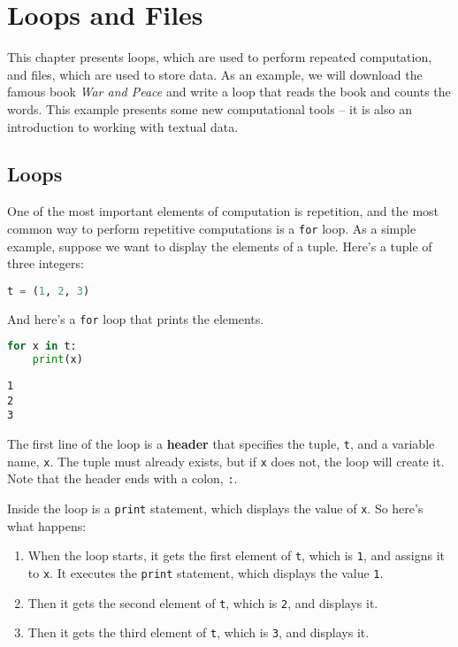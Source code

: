 \chapter{Loops and Files}\label{loops-and-files}

This chapter presents loops, which are used to perform repeated
computation, and files, which are used to store data. As an example, we
will download the famous book \emph{War and Peace} and write a loop that
reads the book and counts the words. This example presents some new
computational tools -- it is also an introduction to working with
textual data.

\section{Loops}\label{loops}

One of the most important elements of computation is repetition, and the
most common way to perform repetitive computations is a
\passthrough{\lstinline!for!} loop. As a simple example, suppose we want
to display the elements of a tuple. Here's a tuple of three integers:

\begin{lstlisting}[language=Python,style=source]
t = (1, 2, 3)
\end{lstlisting}

And here's a \passthrough{\lstinline!for!} loop that prints the
elements.

\begin{lstlisting}[language=Python,style=source]
for x in t:
    print(x)
\end{lstlisting}

\begin{lstlisting}[style=output]
1
2
3
\end{lstlisting}

The first line of the loop is a \textbf{header} that specifies the
tuple, \passthrough{\lstinline!t!}, and a variable name,
\passthrough{\lstinline!x!}. The tuple must already exists, but if
\passthrough{\lstinline!x!} does not, the loop will create it. Note that
the header ends with a colon, \passthrough{\lstinline!:!}.

\pagebreak

Inside the loop is a \passthrough{\lstinline!print!} statement, which
displays the value of \passthrough{\lstinline!x!}. So here's what
happens:

\begin{enumerate}
\def\labelenumi{\arabic{enumi}.}
\item
  When the loop starts, it gets the first element of
  \passthrough{\lstinline!t!}, which is \passthrough{\lstinline!1!}, and
  assigns it to \passthrough{\lstinline!x!}. It executes the
  \passthrough{\lstinline!print!} statement, which displays the value
  \passthrough{\lstinline!1!}.
\item
  Then it gets the second element of \passthrough{\lstinline!t!}, which
  is \passthrough{\lstinline!2!}, and displays it.
\item
  Then it gets the third element of \passthrough{\lstinline!t!}, which
  is \passthrough{\lstinline!3!}, and displays it.
\end{enumerate}

